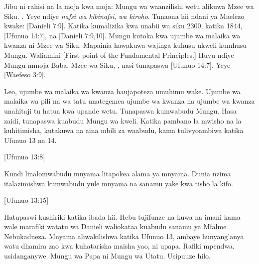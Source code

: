 Jibu ni rahisi na la moja kwa moja: Mungu wa waanzilishi wetu alikuwa Mzee wa Siku. . Yeye ndiye \textit{nafsi wa kibinafsi}, \textit{wa kiroho}. Tunaona hii ndani ya Maelezo kwake: [Danieli 7:9]. Katika kumalizika kwa unabii wa siku 2300, katika 1844, [Ufunuo 14:7],  na [Danieli 7:9,10]. Mungu kutoka kwa ujumbe wa malaika wa kwanza ni Mzee wa Siku. Mapainia hawakuwa wajinga kuhusu ukweli kumhusu Mungu. Waliamini [First point of the Fundamental Principles.] Huyu ndiye Mungu mmoja Baba, Mzee wa Siku, , nasi tunapaswa [Ufunuo 14:7]. Yeye [Waefeso 3:9].

Leo, ujumbe wa malaika wa kwanza haujapoteza umuhimu wake. Ujumbe wa malaika wa pili na wa tatu unategemea ujumbe wa kwanza na ujumbe wa kwanza unahitaji tu hatua kwa upande wetu. Tunapaswa kumwabudu Mungu. Hasa zaidi, tunapaswa kuabudu Mungu wa kweli. Katika pambano la mwisho na la kuhitimisha, kutakuwa na aina mbili za waabudu, kama tulivyoambiwa katika Ufunuo 13 na 14.

[Ufunuo 13:8]

Kundi linalomwabudu mnyama litapokea alama ya mnyama. Dunia nzima italazimishwa kumwabudu yule mnyama na sanamu yake kwa tisho la kifo.

[Ufunuo 13:15]

Hatupaswi kushiriki katika ibada hii. Hebu tujifunze na kuwa na imani kama wale marafiki watatu wa Danieli waliokataa kuabudu sanamu ya Mfalme Nebukadneza. Mnyama aliwakilishwa katika Ufunuo 13, ambaye hunyang'anya watu dhamira zao kwa kuhatarisha maisha yao, ni upapa. Rafiki mpendwa, usidanganywe. Mungu wa Papa ni Mungu wa Utatu. Usipuuze hilo.

